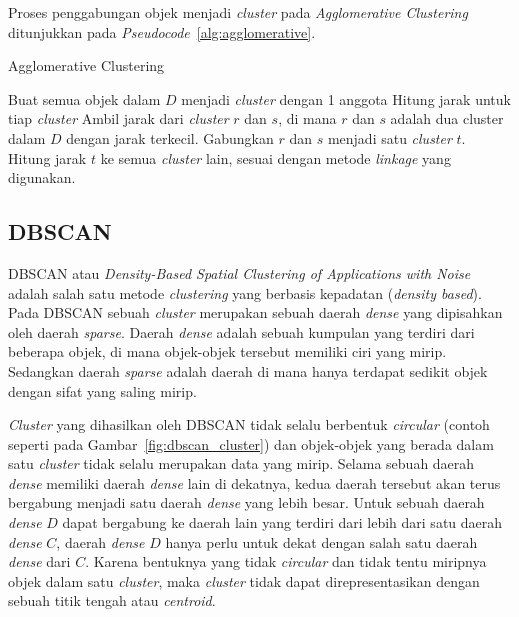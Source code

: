 Proses penggabungan objek menjadi \textit{cluster} pada \textit{Agglomerative Clustering} ditunjukkan pada \textit{Pseudocode}~\ref{alg:agglomerative}. \\
\begin{algorithm}[H]
	\caption{Agglomerative Clustering}
	\label{alg:agglomerative}
	\begin{algorithmic}[1]
		\STATE Buat semua objek dalam $D$ menjadi \textit{cluster} dengan 1 anggota
		\STATE Hitung jarak untuk tiap \textit{cluster}
		\STATE Ambil jarak dari \textit{cluster} $r$ dan $s$, di mana $r$ dan $s$ adalah dua cluster dalam $D$ dengan jarak terkecil.
		\STATE Gabungkan $r$ dan $s$ menjadi satu \textit{cluster} $t$. 
		\STATE Hitung jarak $t$ ke semua \textit{cluster} lain, sesuai dengan metode \textit{linkage} yang digunakan.
		\ENDWHILE
	\end{algorithmic}
\end{algorithm}

\subsection{DBSCAN}
\label{subsec:clustering_dbscan}
DBSCAN atau \textit{Density-Based Spatial Clustering of Applications with Noise} adalah salah satu metode \textit{clustering} yang berbasis kepadatan (\textit{density based}). Pada DBSCAN sebuah \textit{cluster} merupakan sebuah daerah \textit{dense} yang dipisahkan oleh daerah \textit{sparse}. Daerah \textit{dense} adalah sebuah kumpulan yang terdiri dari beberapa objek, di mana objek-objek tersebut memiliki ciri yang mirip. Sedangkan daerah \textit{sparse} adalah daerah di mana hanya terdapat sedikit objek dengan sifat yang saling mirip.

\textit{Cluster} yang dihasilkan oleh DBSCAN tidak selalu berbentuk \textit{circular} (contoh seperti pada Gambar~\ref{fig:dbscan_cluster}) dan objek-objek yang berada dalam satu \textit{cluster} tidak selalu merupakan data yang mirip. Selama sebuah daerah \textit{dense} memiliki daerah \textit{dense} lain di dekatnya, kedua daerah tersebut akan terus bergabung menjadi satu daerah \textit{dense} yang lebih besar. Untuk sebuah daerah \textit{dense} $D$ dapat bergabung ke daerah lain yang terdiri dari lebih dari satu daerah \textit{dense} $C$, daerah \textit{dense} $D$ hanya perlu untuk dekat dengan salah satu daerah \textit{dense} dari $C$. Karena bentuknya yang tidak \textit{circular} dan tidak tentu miripnya objek dalam satu \textit{cluster}, maka \textit{cluster} tidak dapat direpresentasikan dengan sebuah titik tengah atau \textit{centroid}.

